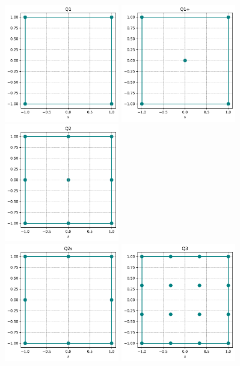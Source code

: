 \begin{center}
\includegraphics[width=5cm]{python_codes/fieldstone_120/spaces/Q1_nodes}
\includegraphics[width=5cm]{python_codes/fieldstone_120/spaces/Q1+_nodes}
\includegraphics[width=5cm]{python_codes/fieldstone_120/spaces/Q2_nodes}\\
\includegraphics[width=5cm]{python_codes/fieldstone_120/spaces/Q2s_nodes}
\includegraphics[width=5cm]{python_codes/fieldstone_120/spaces/Q3_nodes}

\end{center}
